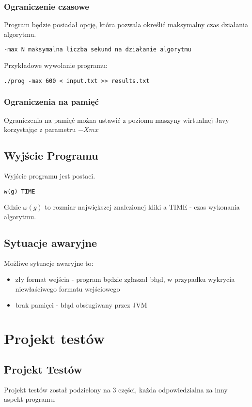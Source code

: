 \documentclass[12pt, a4paper]{article}
\begin{document}
\subsubsection{Ograniczenie czasowe}
Program będzie posiadał opcję, która pozwala określić maksymalny czas działania algorytmu.

\begin{verbatim}
-max N maksymalna liczba sekund na działanie algorytmu
\end{verbatim}
Przykładowe wywołanie programu:

\begin{verbatim}
./prog -max 600 < input.txt >> results.txt
\end{verbatim}

\subsubsection{Ograniczenia na pamięć}
Ograniczenia na pamięć można ustawić z poziomu maszyny wirtualnej Javy korzystając z parametru $-Xmx$

\subsection{Wyjście Programu}

Wyjście programu jest postaci.

\begin{verbatim}
w(g) TIME
\end{verbatim}
Gdzie $\omega(g)$ to rozmiar największej znalezionej kliki a $\text{TIME}$ - czas wykonania algorytmu.

\subsection{Sytuacje awaryjne}
Możliwe sytuacje awaryjne to:

\begin{itemize}
\item zły format wejścia - program będzie zgłaszał błąd, w przypadku wykrycia niewłaściwego formatu wejściowego
\item brak pamięci - błąd obsługiwany przez JVM
\end{itemize}

\section{Projekt testów}
\label{sec-4}

\subsection{Projekt Testów}
Projekt testów został podzielony na 3 części, każda odpowiedzialna za inny aspekt programu.
\end{document}
